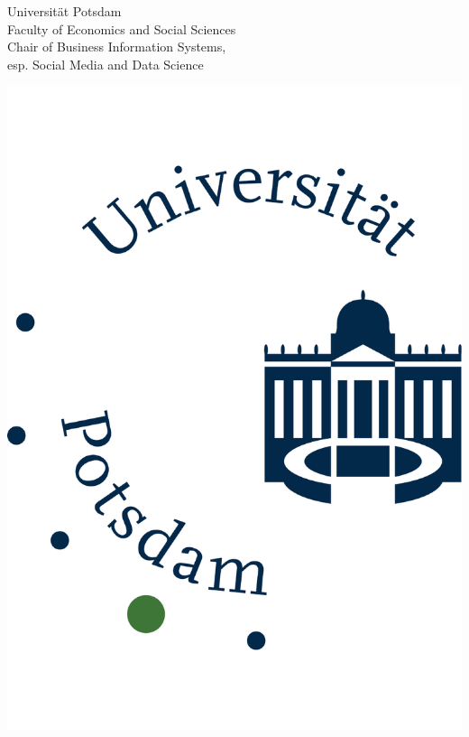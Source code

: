\begin{titlepage}


\thispagestyle{fancy}
\fancyhf{}

	

\begin{center}
				
				\begin{minipage}[t]{11cm}
							\vspace*{0.1cm}
							Universität Potsdam \\
							Faculty of Economics and Social Sciences\\
							Chair of Business Information Systems,\\
							esp. Social Media and Data Science
				\end{minipage}
				\begin{minipage}[t]{3cm} \vspace{-\ht\strutbox}
							\begin{center} 
							\includegraphics[width=\textwidth]{assets/images/logo} \end{center}
				\end{minipage} 
				  

\end{center}
\end{titlepage}
